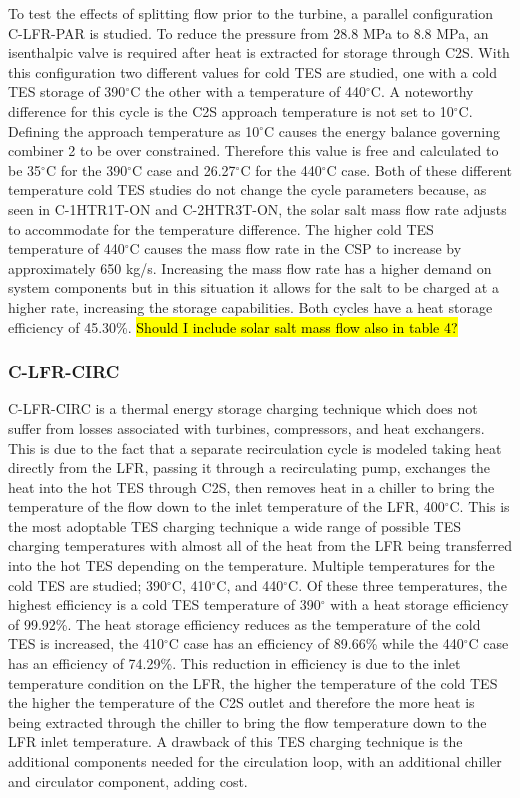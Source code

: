 \begin{paracol}{2}
To test the effects of splitting flow prior to the turbine, a parallel configuration C-LFR-PAR is studied. To reduce the pressure from 28.8 MPa to 8.8 MPa, an isenthalpic valve is required after heat is extracted for storage through C2S. With this configuration two different values for cold TES are studied, one with a cold TES storage of 390$^{\circ}$C the other with a temperature of 440$^{\circ}$C. A noteworthy difference for this cycle is the C2S approach temperature is not set to 10$^{\circ}$C. Defining the approach temperature as 10$^{\circ}$C causes the energy balance governing combiner 2 to be over constrained. Therefore this value is free and calculated to be 35$^{\circ}$C for the 390$^{\circ}$C case and 26.27$^{\circ}$C for the 440$^{\circ}$C case. Both of these different temperature cold TES studies do not change the cycle parameters because, as seen in C-1HTR1T-ON and C-2HTR3T-ON, the solar salt mass flow rate adjusts to accommodate for the temperature difference. The higher cold TES temperature of 440$^{\circ}$C causes the mass flow rate in the CSP to increase by approximately 650 kg/s. Increasing the mass flow rate has a higher demand on system components but in this situation it allows for the salt to be charged at a higher rate, increasing the storage capabilities. Both cycles have a heat storage efficiency of 45.30\%. \hl{Should I include solar salt mass flow also in table 4?}

\subsubsection{C-LFR-CIRC}

C-LFR-CIRC is a thermal energy storage charging technique which does not suffer from losses associated with turbines, compressors, and heat exchangers. This is due to the fact that a separate recirculation cycle is modeled taking heat directly from the LFR, passing it through a recirculating pump, exchanges the heat into the hot TES through C2S, then removes heat in a chiller to bring the temperature of the flow down to the inlet temperature of the LFR, 400$^{\circ}$C. This is the most adoptable TES charging technique a wide range of possible TES charging temperatures with almost all of the heat from the LFR being transferred into the hot TES depending on the temperature. Multiple temperatures for the cold TES are studied; 390$^{\circ}$C, 410$^{\circ}$C, and 440$^{\circ}$C. Of these three temperatures, the highest efficiency is a cold TES temperature of 390$^{\circ}$ with a heat storage efficiency of 99.92\%. The heat storage efficiency reduces as the temperature of the cold TES is increased, the 410$^{\circ}$C case has an efficiency of 89.66\% while the 440$^{\circ}$C case has an efficiency of 74.29\%. This reduction in efficiency is due to the inlet temperature condition on the LFR, the higher the temperature of the cold TES the higher the temperature of the C2S outlet and therefore the more heat is being extracted through the chiller to bring the flow temperature down to the LFR inlet temperature. A drawback of this TES charging technique is the additional components needed for the circulation loop, with an additional chiller and circulator component, adding cost. 


\end{paracol}

